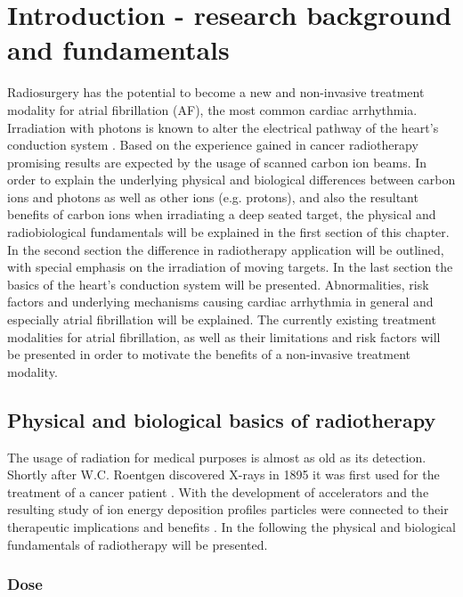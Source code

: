 \chapter{Introduction - research background and fundamentals}
\label{chapter:intro}
\minitoc


Radiosurgery has the potential to become a new and non-invasive treatment modality for atrial fibrillation (AF), the most common cardiac arrhythmia. 
Irradiation with photons is known to alter the electrical pathway of the heart's conduction system \cite{Sha10}. Based on the 
experience gained in cancer radiotherapy promising results are expected by the usage of scanned carbon ion beams. In order to explain the 
underlying physical and biological differences between carbon ions and photons as well as other ions (e.g. protons), and also the resultant benefits 
of carbon ions when irradiating a deep seated target, the physical and radiobiological fundamentals will be explained in the first section of 
this chapter. In the second section the difference in radiotherapy application will be outlined, with special emphasis on the 
irradiation of moving targets. In the last section the basics of the heart's conduction system will be presented. Abnormalities, risk 
factors and underlying mechanisms causing cardiac arrhythmia in general and especially atrial fibrillation will be explained. The currently 
existing treatment modalities for atrial fibrillation, as well as their limitations and risk factors will be presented in order to motivate 
the benefits of a non-invasive treatment modality. 


\section{Physical and biological basics of radiotherapy}
\label{pbb}
The usage of radiation for medical purposes is almost as old as its detection. Shortly after W.C. Roentgen discovered X-rays in 1895 it 
was first used for the treatment of a cancer patient \cite{Hal06}. With the development of accelerators and the resulting study of ion 
energy deposition profiles particles were connected to their therapeutic implications and benefits 
\cite{Wil46}. In the following the physical and biological fundamentals of radiotherapy will be presented.


\subsection{Dose}

